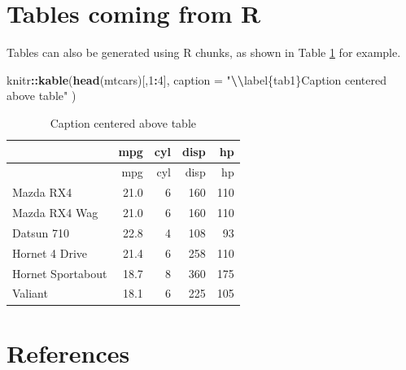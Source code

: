 \documentclass[
]{article}
\newenvironment{Shaded}{\begin{snugshade}}{\end{snugshade}}
\newcommand{\AttributeTok}[1]{\textcolor[rgb]{0.13,0.29,0.53}{#1}}
\newcommand{\DecValTok}[1]{\textcolor[rgb]{0.00,0.00,0.81}{#1}}
\newcommand{\FunctionTok}[1]{\textcolor[rgb]{0.13,0.29,0.53}{\textbf{#1}}}
\newcommand{\NormalTok}[1]{#1}
\newcommand{\SpecialCharTok}[1]{\textcolor[rgb]{0.81,0.36,0.00}{\textbf{#1}}}
\newcommand{\StringTok}[1]{\textcolor[rgb]{0.31,0.60,0.02}{#1}}
\begin{document}
\section{Tables coming from R}\label{tables-coming-from-r}

Tables can also be generated using R chunks, as shown in Table
\ref{tab1} for example.

\begin{Shaded}
\begin{Highlighting}[]
\NormalTok{knitr}\SpecialCharTok{::}\FunctionTok{kable}\NormalTok{(}\FunctionTok{head}\NormalTok{(mtcars)[,}\DecValTok{1}\SpecialCharTok{:}\DecValTok{4}\NormalTok{], }
    \AttributeTok{caption =} \StringTok{"}\SpecialCharTok{\textbackslash{}\textbackslash{}}\StringTok{label\{tab1\}Caption centered above table"}
\NormalTok{)}
\end{Highlighting}
\end{Shaded}

\begin{longtable}[]{@{}lrrrr@{}}
\caption{\label{tab1}Caption centered above table}\tabularnewline
\toprule\noalign{}
& mpg & cyl & disp & hp \\
\midrule\noalign{}
\endfirsthead
\toprule\noalign{}
& mpg & cyl & disp & hp \\
\midrule\noalign{}
\endhead
\bottomrule\noalign{}
\endlastfoot
Mazda RX4 & 21.0 & 6 & 160 & 110 \\
Mazda RX4 Wag & 21.0 & 6 & 160 & 110 \\
Datsun 710 & 22.8 & 4 & 108 & 93 \\
Hornet 4 Drive & 21.4 & 6 & 258 & 110 \\
Hornet Sportabout & 18.7 & 8 & 360 & 175 \\
Valiant & 18.1 & 6 & 225 & 105 \\
\end{longtable}

\section*{References}\label{references}
\end{document}
